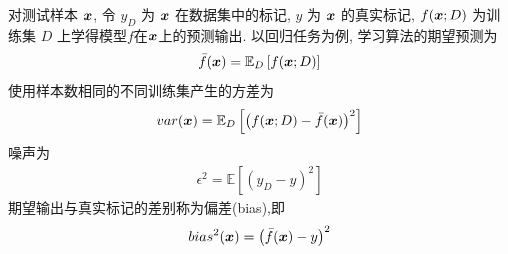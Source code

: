 对测试样本 $\bm{x}$, 令 $y_D$ 为 $\bm{x}$ 在数据集中的标记, $y$ 为 $\bm{x}$ 的真实标记, $f(\bm{x};D)$ 为训练集 $D$ 上学得模型$f$在$\bm{x}$上的预测输出. 以回归任务为例, 学习算法的期望预测为
\begin{align*}
    \bar{f}(\bm{x})=\mathbb{E}_D\left[ f(\bm{x};D) \right]
\end{align*}
使用样本数相同的不同训练集产生的方差为
\begin{align*}
    var(\bm{x})=\mathbb{E}_D\left[ \left( f(\bm{x};D)-\bar{f}(\bm{x}) \right)^2 \right]
\end{align*}
噪声为
\begin{align*}
    \epsilon^2=\mathbb{E}\left[ (y_D-y)^2 \right]
\end{align*}
期望输出与真实标记的差别称为偏差(bias),即
\begin{align*}
    bias^2(\bm{x})=\left( \bar{f}(\bm{x})-y \right)^2
\end{align*}

